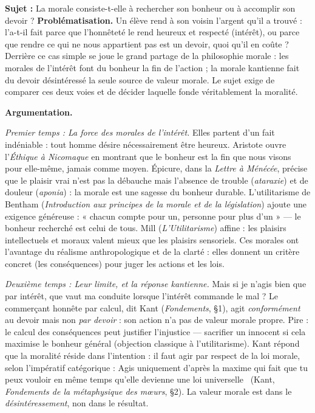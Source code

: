 \documentclass[11pt]{article}
\begin{document}
\begin{exoresolu}
\textbf{Sujet :} La morale consiste-t-elle à rechercher son bonheur ou à accomplir son devoir ?
\tcblower
\textbf{Problématisation.} Un élève rend à son voisin l'argent qu'il a trouvé : l'a-t-il fait parce que l'honnêteté le rend heureux et respecté (intérêt), ou parce que rendre ce qui ne nous appartient pas est un devoir, quoi qu'il en coûte ? Derrière ce cas simple se joue le grand partage de la philosophie morale : les morales de l'intérêt font du bonheur la fin de l'action ; la morale kantienne fait du devoir désintéressé la seule source de valeur morale. Le sujet exige de comparer ces deux voies et de décider laquelle fonde véritablement la moralité.

\textbf{Argumentation.}

\emph{Premier temps : La force des morales de l'intérêt.} Elles partent d'un fait indéniable : tout homme désire nécessairement être heureux. Aristote ouvre l'\emph{Éthique à Nicomaque} en montrant que le bonheur est la fin que nous visons pour elle-même, jamais comme moyen. Épicure, dans la \emph{Lettre à Ménécée}, précise que le plaisir vrai n'est pas la débauche mais l'absence de trouble (\emph{ataraxie}) et de douleur (\emph{aponia}) : la morale est une sagesse du bonheur durable. L'utilitarisme de Bentham (\emph{Introduction aux principes de la morale et de la législation}) ajoute une exigence généreuse : « chacun compte pour un, personne pour plus d'un » — le bonheur recherché est celui de tous. Mill (\emph{L'Utilitarisme}) affine : les plaisirs intellectuels et moraux valent mieux que les plaisirs sensoriels. Ces morales ont l'avantage du réalisme anthropologique et de la clarté : elles donnent un critère concret (les conséquences) pour juger les actions et les lois.

\emph{Deuxième temps : Leur limite, et la réponse kantienne.} Mais si je n'agis bien que par intérêt, que vaut ma conduite lorsque l'intérêt commande le mal ? Le commerçant honnête par calcul, dit Kant (\emph{Fondements}, §1), agit \emph{conformément} au devoir mais non \emph{par devoir} : son action n'a pas de valeur morale propre. Pire : le calcul des conséquences peut justifier l'injustice — sacrifier un innocent si cela maximise le bonheur général (objection classique à l'utilitarisme). Kant répond que la moralité réside dans l'intention : il faut agir par respect de la loi morale, selon l'impératif catégorique : \guillemotleft Agis uniquement d'après la maxime qui fait que tu peux vouloir en même temps qu'elle devienne une loi universelle \guillemotright\ (Kant, \emph{Fondements de la métaphysique des mœurs}, §2). La valeur morale est dans le \emph{désintéressement}, non dans le résultat.


\end{exoresolu}
\end{document}
